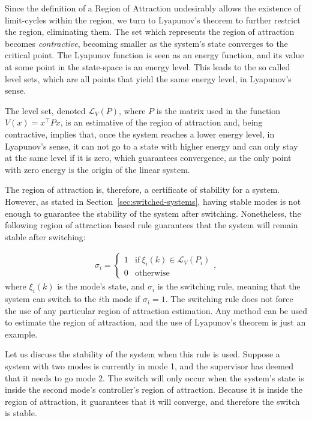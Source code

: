 Since the definition of a Region of Attraction undesirably allows the existence
of limit-cycles within the region, we turn to Lyapunov's theorem to further
restrict the region, eliminating them. The set which represents the region of
attraction becomes \textit{contractive}, becoming smaller as the system's state
converges to the critical point. The Lyapunov function is seen as an energy
function, and its value at some point in the state-space is an energy level.
This leads to the so called level sets, which are all points that yield the same
energy level, in Lyapunov's sense.

The level set, denoted \(\mathcal{L}_{V}(P)\), where \(P\) is the matrix used in
the function \(V(x)=x^{\top}Px\), is an estimative of the region of attraction and,
being contractive, implies that, once the system reaches a lower energy level,
in Lyapunov's sense, it can not go to a state with higher energy and can only
stay at the same level if it is zero, which guarantees convergence, as the only
point with zero energy is the origin of the linear system.

The region of attraction is, therefore, a certificate of stability for a system.
However, as stated in Section~\ref{sec:switched-systems}, having stable modes is
not enough to guarantee the stability of the system after switching.
Nonetheless, the following region of attraction based rule guarantees that the
system will remain stable after switching:

\begin{align}
  \sigma_{i} = \begin{cases}
    1 & \textrm{if}~\xi_{i}(k)\in\mathcal{L}_V(P_i) \\
    0 & \textrm{otherwise}
  \end{cases},
\end{align}
%
where \(\xi_{i}(k)\) is the mode's state, and \(\sigma_{i}\) is the switching rule,
meaning that the system can switch to the \(i\)th mode if \(\sigma_{i}=1\). The
switching rule does not force the use of any particular region of attraction
estimation. Any method can be used to estimate the region of attraction, and the
use of Lyapunov's theorem is just an example.

Let us discuss the stability of the system when this rule is used. Suppose a
system with two modes is currently in mode 1, and the supervisor has deemed that
it needs to go mode 2. The switch will only occur when the system's state is
inside the second mode's controller's region of attraction. Because it is inside
the region of attraction, it guarantees that it will converge, and therefore the
switch is stable.

